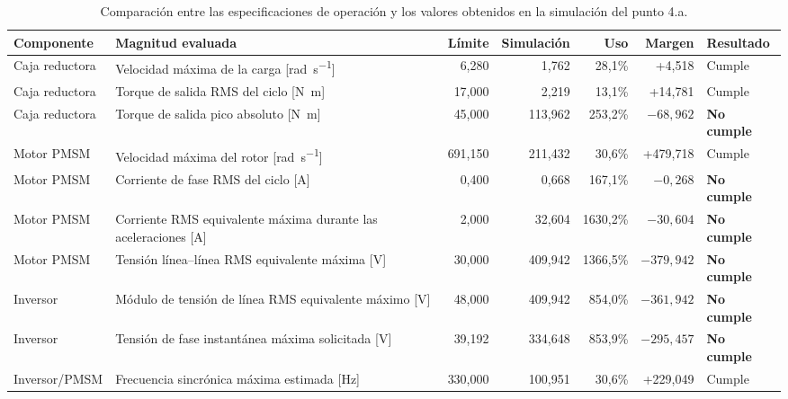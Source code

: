 \documentclass[10pt,a4paper]{article}
\begin{document}
\begin{table}[htbp]
	\centering
	\caption{Comparación entre las especificaciones de operación y los valores obtenidos en la simulación del punto 4.a.}
	\label{tab:limites_operacion_4a}
	\scriptsize
	\setlength{\tabcolsep}{3.5pt}
	\begin{tabularx}{\textwidth}{@{}lXrrrrl@{}}
		\toprule
		\textbf{Componente} & \textbf{Magnitud evaluada} &
		\textbf{Límite} & \textbf{Simulación} &
		\textbf{Uso} & \textbf{Margen} & \textbf{Resultado} \\
		\midrule
		Caja reductora & Velocidad máxima de la carga [\si{\radian\per\second}] &
		6,280 & 1,762 & 28,1\% & +4,518 & Cumple \\
		
		Caja reductora & Torque de salida RMS del ciclo [\si{\newton\metre}] &
		17,000 & 2,219 & 13,1\% & +14,781 & Cumple \\
		
		Caja reductora & Torque de salida pico absoluto [\si{\newton\metre}] &
		45,000 & 113,962 & 253,2\% & $-68,962$ & \textbf{No cumple} \\
		
		Motor PMSM & Velocidad máxima del rotor [\si{\radian\per\second}] &
		691,150 & 211,432 & 30,6\% & +479,718 & Cumple \\
		
		Motor PMSM & Corriente de fase RMS del ciclo [\si{\ampere}] &
		0,400 & 0,668 & 167,1\% & $-0,268$ & \textbf{No cumple} \\
		
		Motor PMSM & Corriente RMS equivalente máxima durante las aceleraciones [\si{\ampere}] &
		2,000 & 32,604 & 1630,2\% & $-30,604$ & \textbf{No cumple} \\
		
		Motor PMSM & Tensión línea--línea RMS equivalente máxima [\si{\volt}] &
		30,000 & 409,942 & 1366,5\% & $-379,942$ & \textbf{No cumple} \\
		
		Inversor & Módulo de tensión de línea RMS equivalente máximo [\si{\volt}] &
		48,000 & 409,942 & 854,0\% & $-361,942$ & \textbf{No cumple} \\
		
		Inversor & Tensión de fase instantánea máxima solicitada [\si{\volt}] &
		39,192 & 334,648 & 853,9\% & $-295,457$ & \textbf{No cumple} \\
		
		Inversor/PMSM & Frecuencia sincrónica máxima estimada [\si{\hertz}] &
		330,000 & 100,951 & 30,6\% & +229,049 & Cumple \\
		\bottomrule
	\end{tabularx}
\end{table}
\end{document}
